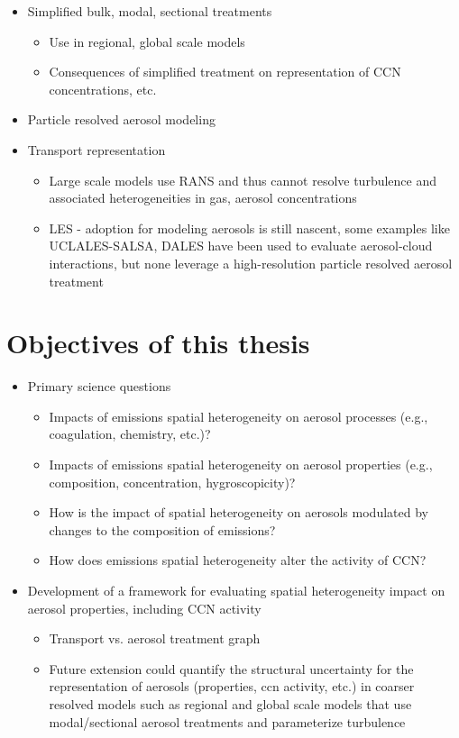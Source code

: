 \begin{itemize}

\item Simplified bulk, modal, sectional treatments
\begin{itemize}
\item Use in regional, global scale models
\item Consequences of simplified treatment on representation of CCN concentrations, etc. 
\end{itemize}
\item Particle resolved aerosol modeling
\item Transport representation 
\begin{itemize}
\item Large scale models use RANS and thus cannot resolve turbulence and associated heterogeneities in gas, aerosol concentrations
\item LES - adoption for modeling aerosols is still nascent, some examples like UCLALES-SALSA, DALES have been used to evaluate aerosol-cloud interactions, but none leverage a high-resolution particle resolved aerosol treatment
\end{itemize}

\end{itemize}

\section{Objectives of this thesis}

\begin{itemize}

\item Primary science questions
\begin{itemize}
\item Impacts of emissions spatial heterogeneity on aerosol processes (e.g., coagulation, chemistry, etc.)?
\item Impacts of emissions spatial heterogeneity on aerosol properties (e.g., composition, concentration, hygroscopicity)? 
\item How is the impact of spatial heterogeneity on aerosols modulated by changes to the composition of emissions?
\item How does emissions spatial heterogeneity alter the activity of CCN?
\end{itemize}

\item Development of a framework for evaluating spatial heterogeneity impact on aerosol properties, including CCN activity
\begin{itemize}
\item Transport vs. aerosol treatment graph 
\item Future extension could quantify the structural uncertainty for the representation of aerosols (properties, ccn activity, etc.) in coarser resolved models such as regional and global scale models that use modal/sectional aerosol treatments and parameterize turbulence 
\end{itemize}

\end{itemize}

